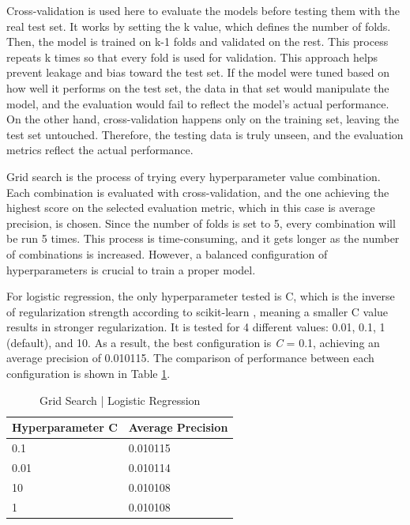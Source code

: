 \documentclass[ %
                    author={Natchalin Iwsakul \\[0.4em] Inkaphol Siriwongwattana \\[0.4em] Tanaphan Kummaraphat \\[0.6em] Patorn Srisupap},,
                supervisor={Fernando Moreno-Pino},
                    degree={MSc},
                     title={Propensity Modelling for SME Commercial Lending Using Open Public Data
},
                  subtitle={Companies House and GDELT as predictors of first-time borrowing},
                      type={},
                      year={2026}]{dissertation}
\begin{document}
  Cross-validation is used here to evaluate the models before testing them with the real test set. It works by setting the k value, which defines the number of folds. Then, the model is trained on k-1 folds and validated on the rest. This process repeats k times so that every fold is used for validation. This approach helps prevent leakage and bias toward the test set. If the model were tuned based on how well it performs on the test set, the data in that set would manipulate the model, and the evaluation would fail to reflect the model's actual performance. On the other hand, cross-validation happens only on the training set, leaving the test set untouched. Therefore, the testing data is truly unseen, and the evaluation metrics reflect the actual performance.

  Grid search is the process of trying every hyperparameter value combination. Each combination is evaluated with cross-validation, and the one achieving the highest score on the selected evaluation metric, which in this case is average precision, is chosen. Since the number of folds is set to 5, every combination will be run 5 times. This process is time-consuming, and it gets longer as the number of combinations is increased. However, a balanced configuration of hyperparameters is crucial to train a proper model.

 
  For logistic regression, the only hyperparameter tested is C, which is the inverse of regularization strength according to scikit-learn \cite{Pedregosa_Scikit-learn_Machine_Learning_2011}, meaning a smaller C value results in stronger regularization. It is tested for 4 different values: 0.01, 0.1, 1 (default), and 10. As a result, the best configuration is \textit{C} = 0.1, achieving an average precision of 0.010115. The comparison of performance between each configuration is shown in Table \ref{gridsearchlogistic}. 

  \begin{table}[h]
      \centering
      \begin{tabular}{ll}
      \toprule
          Hyperparameter C & Average Precision \\
      \midrule
          0.1 & 0.010115 \\
          0.01 & 0.010114\\
          10 & 0.010108\\
          1 & 0.010108\\
      \bottomrule
      \end{tabular}
      \caption{Grid Search | Logistic Regression}
      \label{gridsearchlogistic}
  \end{table}
  
\end{document}
